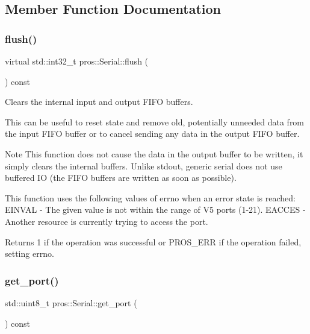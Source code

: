 \subsection{Member Function Documentation}
\mbox{\label{classpros_1_1Serial_a4d897c6f3f83636f4d4627ab02c10e76}} 
\subsubsection{\texorpdfstring{flush()}{flush()}}
{\footnotesize\ttfamily virtual std\+::int32\+\_\+t pros\+::\+Serial\+::flush (\begin{DoxyParamCaption}{ }\end{DoxyParamCaption}) const\hspace{0.3cm}{\ttfamily [virtual]}}

Clears the internal input and output F\+I\+FO buffers.

This can be useful to reset state and remove old, potentially unneeded data from the input F\+I\+FO buffer or to cancel sending any data in the output F\+I\+FO buffer.

\begin{DoxyNote}{Note}
This function does not cause the data in the output buffer to be written, it simply clears the internal buffers. Unlike stdout, generic serial does not use buffered IO (the F\+I\+FO buffers are written as soon as possible).
\end{DoxyNote}
This function uses the following values of errno when an error state is reached\+: E\+I\+N\+V\+AL -\/ The given value is not within the range of V5 ports (1-\/21). E\+A\+C\+C\+ES -\/ Another resource is currently trying to access the port.

\begin{DoxyReturn}{Returns}
1 if the operation was successful or P\+R\+O\+S\+\_\+\+E\+RR if the operation failed, setting errno. 
\end{DoxyReturn}
\mbox{\label{classpros_1_1Serial_a74560cbf9ec7bc3f49cbf54aadb049a9}} 
\subsubsection{\texorpdfstring{get\+\_\+port()}{get\_port()}}
{\footnotesize\ttfamily std\+::uint8\+\_\+t pros\+::\+Serial\+::get\+\_\+port (\begin{DoxyParamCaption}{ }\end{DoxyParamCaption}) const}


